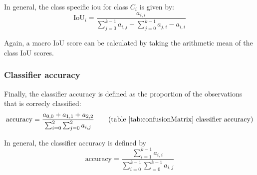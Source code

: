 In general, the class specific \acrfull{iou} for class $C_i$ is given by:
\begin{equation}
    \text{IoU}_i = \frac{a_{i,i}}{\sum_{j=0}^{k-1} a_{i, j} + \sum_{j=0}^{k-1} a_{j,i} - a_{i,i}} 
\end{equation}

Again, a macro IoU score can be calculated by taking the arithmetic mean of the class IoU scores.

\subsubsection{Classifier accuracy}

Finally, the classifier accuracy is defined as the proportion of the observations that is correcly classified:
\begin{equation}
    \text{accuracy} = \frac{a_{0,0} + a_{1,1} + a_{2,2}}{\sum_{i=0}^{2} \sum_{j=0}^{2} a_{i,j}   } \tag{table \ref{tab:confusionMatrix} classifier accuracy}
\end{equation}

In general, the classifier accuracy is defined by 
\begin{equation}
    \text{accuracy} = \frac{\sum_{i=1}^{k-1}a_{i,i}}{\sum_{i=0}^{k-1} \sum_{=0}^{k-1} a_{i,j}   } 
\end{equation}


